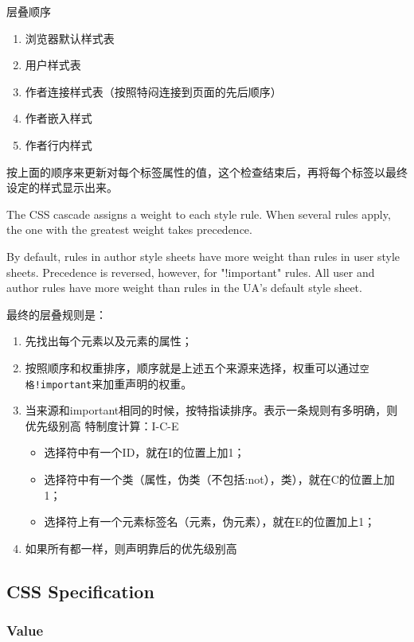 层叠顺序
\begin{enumerate}
\item 浏览器默认样式表
\item 用户样式表
\item 作者连接样式表（按照特闷连接到页面的先后顺序）
\item 作者嵌入样式
\item 作者行内样式
\end{enumerate}

按上面的顺序来更新对每个标签属性的值，这个检查结束后，再将每个标签以最终设定的样式显示出来。

The CSS cascade assigns a weight to each style rule. When several rules apply, the one with the greatest weight takes precedence. 

By default, rules in author style sheets have more weight than rules in user style sheets. Precedence is reversed, however, for "!important" rules. All user and author rules have more weight than rules in the UA's default style sheet. 


最终的层叠规则是：
\begin{enumerate}
\item 先找出每个元素以及元素的属性；
\item 按照顺序和权重排序，顺序就是上述五个来源来选择，权重可以通过\lstinline$空格!important$来加重声明的权重。
\item 当来源和important相同的时候，按特指读排序。表示一条规则有多明确，则优先级别高
特制度计算：I-C-E
\begin{itemize}
\item 选择符中有一个ID，就在I的位置上加1；
\item 选择符中有一个类（属性，伪类（不包括:not），类），就在C的位置上加1；
\item 选择符上有一个元素标签名（元素，伪元素），就在E的位置加上1；
\end{itemize}
\item 如果所有都一样，则声明靠后的优先级别高

\end{enumerate}


\subsection{CSS Specification}

\subsubsection{Value}


